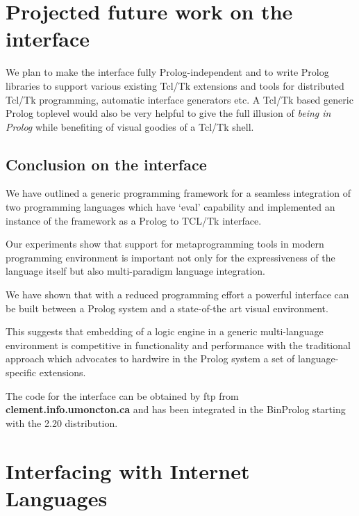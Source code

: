 \documentclass{article}
\begin{document}
\section{Projected future work on the interface}
We plan to make the interface fully Prolog-independent
and to write Prolog libraries to support various
existing Tcl/Tk extensions and tools for
distributed Tcl/Tk programming,
automatic interface generators etc.
A Tcl/Tk based generic Prolog toplevel would also
be very helpful to give the full illusion of
{\em being in Prolog} while benefiting of
visual goodies of a Tcl/Tk shell.

\subsection{Conclusion on the interface}

We have outlined a generic programming framework for a seamless
integration of two programming languages which have `eval' capability
and implemented an instance of the framework as a Prolog to TCL/Tk
interface.

Our experiments show that
support for metaprogramming tools
in modern programming environment
is important not only for the expressiveness of the
language itself but also multi-paradigm language
integration.

We have shown that with a reduced programming effort
a powerful interface can be built between a Prolog system and
a state-of-the art visual environment. 

This suggests that embedding of a logic engine in a
generic multi-language
environment is competitive in functionality and performance
with the traditional approach which advocates to hardwire
in the Prolog system a set of language-specific extensions.

The code for the interface can be obtained by ftp from
{\bf clement.info.umoncton.ca} and has been integrated in the
BinProlog starting with the 2.20 distribution.

\section{Interfacing with Internet Languages}


\end{document}
